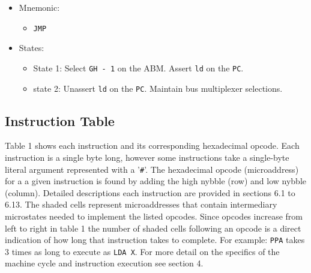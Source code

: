 \documentclass[a4paper,12pt]{article}
\newcommand{\PC}{\texttt{PC}}
\begin{document}
\begin{itemize}
\item Mnemonic:
\begin{itemize}
	\item \texttt{JMP}
\end{itemize}
\item States:
\begin{itemize}
	\item State 1: Select \texttt{GH - 1} on the ABM. Assert \texttt{ld} on
	the \PC{}.
	\item state 2: Unassert \texttt{ld} on the \PC{}. Maintain bus 
	multiplexer selections.
\end{itemize}
\end{itemize}

\subsection{Instruction Table}
Table 1 shows each instruction and its corresponding hexadecimal opcode. Each
instruction is a single byte long, however some instructions take a single-byte
literal argument represented with a '\texttt{\#}'. The hexadecimal opcode
(microaddress) for a a given instruction is found by adding the high nybble
(row) and low nybble (column). Detailed descriptions each instruction are
provided in sections 6.1 to 6.13. The shaded cells represent microaddresses
that contain intermediary microstates needed to implement the listed opcodes.
Since opcodes increase from left to right in table 1 the number of shaded cells
following an opcode is a direct indication of how long that instruction takes
to complete. For example: \texttt{PPA} takes 3 times as long to execute as
\texttt{LDA X}. For more detail on the specifics of the machine cycle and
instruction execution see section 4.
\par

\newpage

\newcommand{\fc}{\cellcolor{ucode-grey}}
\end{document}
